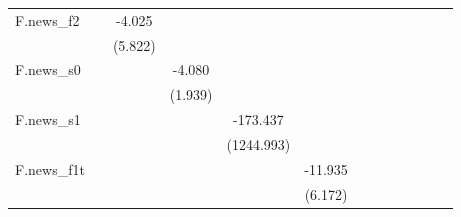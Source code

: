{\begin{tabular}{l*{12}{c}}
\addlinespace
F.news\_f2   &                     &      -4.025         &                     &                     &                     &                     &                     &                     &                     &                     &                     &                     \\
            &                     &     (5.822)         &                     &                     &                     &                     &                     &                     &                     &                     &                     &                     \\
\addlinespace
F.news\_s0   &                     &                     &      -4.080\sym{**} &                     &                     &                     &                     &                     &                     &                     &                     &                     \\
            &                     &                     &     (1.939)         &                     &                     &                     &                     &                     &                     &                     &                     &                     \\
\addlinespace
F.news\_s1   &                     &                     &                     &    -173.437         &                     &                     &                     &                     &                     &                     &                     &                     \\
            &                     &                     &                     &  (1244.993)         &                     &                     &                     &                     &                     &                     &                     &                     \\
\addlinespace
F.news\_f1t  &                     &                     &                     &                     &     -11.935\sym{*}  &                     &                     &                     &                     &                     &                     &                     \\
            &                     &                     &                     &                     &     (6.172)         &                     &                     &                     &                     &                     &                     &                     \\

\end{tabular}}
